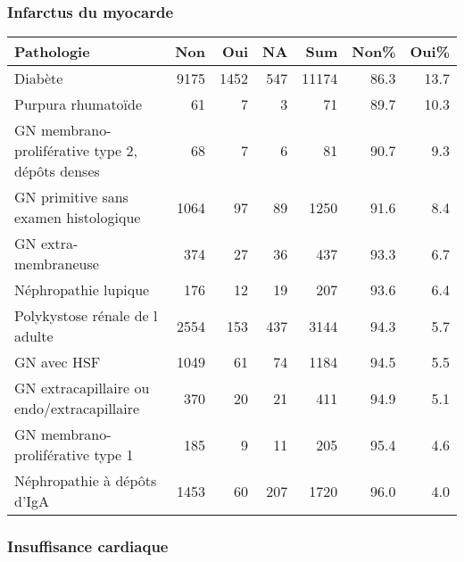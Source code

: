 \documentclass[11pt,a4paper]{article}\usepackage[]{graphicx}\usepackage[]{color}
\begin{document}
\subsubsection*{Infarctus du myocarde}

\begin{table}[H]
\centering
\begin{tabular}{lrrrrrr}
  \hline
Pathologie & Non & Oui & NA & Sum & Non\% & Oui\% \\ 
  \hline
Diabète & 9175 & 1452 & 547 & 11174 & 86.3 & 13.7 \\ 
  Purpura rhumatoïde & 61 &  7 &  3 & 71 & 89.7 & 10.3 \\ 
  GN membrano-proliférative type 2, dépôts denses & 68 &  7 &  6 & 81 & 90.7 & 9.3 \\ 
  GN primitive sans examen histologique & 1064 & 97 & 89 & 1250 & 91.6 & 8.4 \\ 
  GN extra-membraneuse & 374 & 27 & 36 & 437 & 93.3 & 6.7 \\ 
  Néphropathie lupique & 176 & 12 & 19 & 207 & 93.6 & 6.4 \\ 
  Polykystose rénale de l adulte & 2554 & 153 & 437 & 3144 & 94.3 & 5.7 \\ 
  GN avec HSF & 1049 & 61 & 74 & 1184 & 94.5 & 5.5 \\ 
  GN extracapillaire ou endo/extracapillaire & 370 & 20 & 21 & 411 & 94.9 & 5.1 \\ 
  GN membrano-proliférative type 1 & 185 &  9 & 11 & 205 & 95.4 & 4.6 \\ 
  Néphropathie à dépôts d'IgA & 1453 & 60 & 207 & 1720 & 96.0 & 4.0 \\ 
   \hline
\end{tabular}
\end{table}


\subsubsection*{Insuffisance cardiaque}
\end{document}

